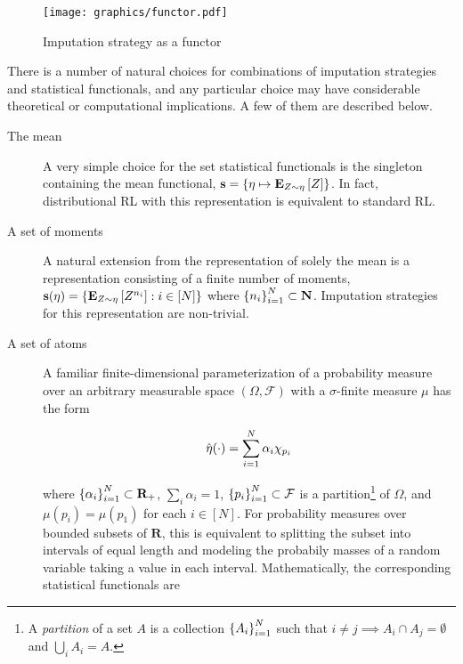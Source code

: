 \begin{figure}[h]
  \centering
  \texttt{[image: graphics/functor.pdf]}
  \caption{Imputation strategy as a functor}
  \label{fig:functor}
\end{figure}

There is a number of natural choices for combinations of imputation
strategies and statistical functionals, and any particular choice may
have considerable theoretical or computational implications. A few of
them are described below.

\begin{description}
  \item[The mean]
    A very simple choice for the set statistical functionals is the
    singleton containing the mean functional, $\mathbf{s} =
    \{\returnmeasure\mapsto\expectation{Z\sim\returnmeasure}{Z}\}$. In
    fact, distributional RL with this representation is equivalent to
    standard RL.

  \item[A set of moments]
    A natural extension from the representation of solely the mean is a
    representation consisting of a finite number of moments,
    ${\mathbf{s}(\returnmeasure) =
    \{\expectation{Z\sim\returnmeasure}{Z^{n_i}} : i\in [N]\}}$ where
    $\indexedint{i}{N}{n}\subset\mathbf{N}$. Imputation strategies for
    this representation are non-trivial.

  \item[A set of atoms]
    A familiar finite-dimensional parameterization of a probability
    measure over an arbitrary measurable space $(\Omega, \mathcal{F})$
    with a $\sigma$-finite measure $\mu$ has the form

    \begin{equation}\label{eq:rep:categorical}
      \hat\returnmeasure(\cdot) = \sum_{i=1}^N\alpha_i\characteristic{p_i}
    \end{equation}

    where $\indexedint{i}{N}{\alpha}\subset\mathbf{R}_+$,
    $\sum_i\alpha_i=1$, $\indexedint{i}{N}{p}\subset\mathcal{F}$ is a
    partition\footnote{A \emph{partition} of a set $A$ is a collection
      $\indexedint{i}{N}{A}$ such that $i\neq j\implies A_i\cap
    A_j=\emptyset$ and $\bigcup_iA_i = A$.} of $\Omega$, and $\mu(p_i) = \mu(p_1)$ for each $i\in
    [N]$. For probability measures over bounded subsets of $\mathbf{R}$,
    this is equivalent to splitting the subset into intervals of equal
    length and modeling the probabily masses of a random variable taking a
    value in each interval. Mathematically, the corresponding statistical
    functionals are


\end{description}

